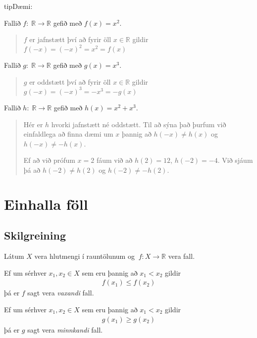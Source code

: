 \documentclass[a4paper,10pt,icelandic]{sphinxmanual}
\begin{document}
\begin{sphinxadmonition}{tip}{Dæmi:}

 Fallið \(f:\;\mathbb{R} \to\mathbb{R}\) gefið með  \(f(x)=x^2\).
\begin{quote}

\(f\) er jafnstætt því að fyrir öll \(x\in\mathbb{R}\) gildir \(f(-x)=(-x)^2=x^2=f(x)\)
\end{quote}

 Fallið \(g:\;\mathbb{R} \to\mathbb{R}\) gefið með  \(g(x)=x^3\).
\begin{quote}

\(g\) er oddstætt því að fyrir öll \(x\in\mathbb{R}\) gildir \(g(-x)=(-x)^3=-x^3=-g(x)\)
\end{quote}

 Fallið \(h:\;\mathbb{R} \to\mathbb{R}\) gefið með  \(h(x)=x^2+x^3\).
\begin{quote}

Hér er \(h\) hvorki jafnstætt né oddstætt. Til að sýna það þurfum við einfaldlega að finna dæmi um \(x\) þannig að \(h(-x)\not=h(x)\) og \(h(-x)\not=-h(x)\).

Ef að við prófum \(x=2\) fáum við að \(h(2)=12\), \(h(-2)=-4\).
Við sjáum þá að \(h(-2)\not=h(2)\) og \(h(-2)\not=-h(2)\).
\end{quote}
\end{sphinxadmonition}


\section{Einhalla föll}
\label{\detokenize{Kafli05:einhalla-foll}}

\subsection{Skilgreining}
\label{\detokenize{Kafli05:id1}}
Látum \(X\) vera hlutmengi í rauntölunum og  \(\ f: X \to \mathbb{R}\) vera fall.

Ef um sérhver \(x_1,x_2 \in X\) sem eru þannig að \(x_1<x_2\) gildir
\begin{equation*}
\begin{split}f(x_1) \leq f(x_2)\end{split}
\end{equation*}
þá er \(f\) sagt vera \textit{vaxandi} fall.

Ef um sérhver \(x_1,x_2 \in X\) sem eru þannig að \(x_1<x_2\) gildir
\begin{equation*}
\begin{split}g(x_1) \geq g(x_2)\end{split}
\end{equation*}
þá er \(g\) sagt vera \textit{minnkandi} fall.
\end{document}

